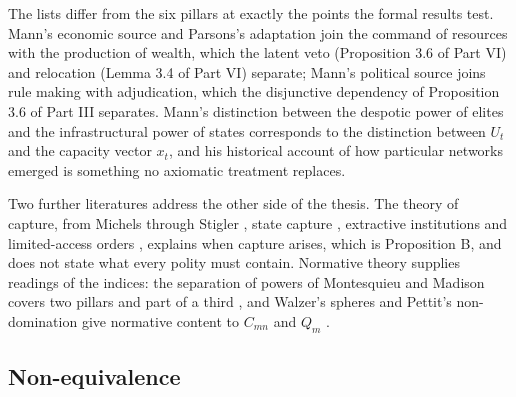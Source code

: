 \documentclass[11pt,letterpaper]{article}
\theoremstyle{definition}
\theoremstyle{remark}
\begin{document}
The lists differ from the six pillars at exactly the points the formal results test. Mann's economic source and Parsons's adaptation join the command of resources with the production of wealth, which the latent veto (Proposition 3.6 of Part VI) and relocation (Lemma 3.4 of Part VI) separate; Mann's political source joins rule making with adjudication, which the disjunctive dependency of Proposition 3.6 of Part III separates. Mann's distinction between the despotic power of elites and the infrastructural power of states \citep{mann1984} corresponds to the distinction between $U_t$ and the capacity vector $x_t$, and his historical account of how particular networks emerged is something no axiomatic treatment replaces.

Two further literatures address the other side of the thesis. The theory of capture, from Michels \citep{michels1915} through Stigler \citep{stigler1971}, state capture \citep{hellman2000}, extractive institutions \citep{acemoglu2006,acemoglu2019} and limited-access orders \citep{nww2009}, explains when capture arises, which is Proposition B, and does not state what every polity must contain. Normative theory supplies readings of the indices: the separation of powers of Montesquieu and Madison covers two pillars and part of a third \citep{montesquieu1989,madison1788}, and Walzer's spheres and Pettit's non-domination give normative content to $C_{mn}$ and $Q_m$ \citep{walzer1983,pettit1997}.

\subsection{Non-equivalence}
\end{document}
